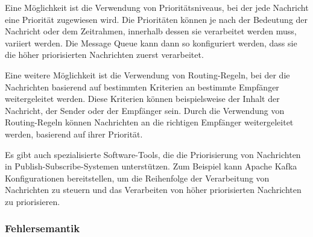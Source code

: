 \documentclass[../vs-script-first-v01.tex]{subfiles}
\begin{document}
Eine Möglichkeit ist die Verwendung von Prioritätsniveaus, bei der jede Nachricht eine Priorität zugewiesen wird. Die Prioritäten können je nach der Bedeutung der Nachricht oder dem Zeitrahmen, innerhalb dessen sie verarbeitet werden muss, variiert werden. Die Message Queue kann dann so konfiguriert werden, dass sie die höher priorisierten Nachrichten zuerst verarbeitet.

Eine weitere Möglichkeit ist die Verwendung von Routing-Regeln, bei der die Nachrichten basierend auf bestimmten Kriterien an bestimmte Empfänger weitergeleitet werden. Diese Kriterien können beispielsweise der Inhalt der Nachricht, der Sender oder der Empfänger sein. Durch die Verwendung von Routing-Regeln können Nachrichten an die richtigen Empfänger weitergeleitet werden, basierend auf ihrer Priorität.

Es gibt auch spezialisierte Software-Tools, die die Priorisierung von Nachrichten in Publish-Subscribe-Systemen unterstützen. Zum Beispiel kann Apache Kafka Konfigurationen bereitstellen, um die Reihenfolge der Verarbeitung von Nachrichten zu steuern und das Verarbeiten von höher priorisierten Nachrichten zu priorisieren.

\subsubsection{Fehlersemantik}
\end{document}
